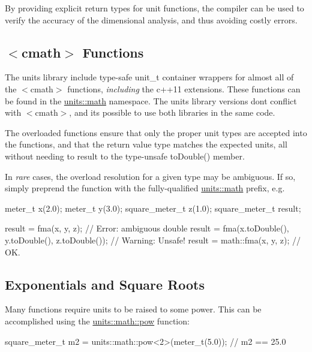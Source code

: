 By providing explicit return types for unit functions, the compiler can be used to verify the accuracy of the dimensional analysis, and thus avoiding costly errors.

\subsection*{{\ttfamily $<$cmath$>$} Functions }

The {\ttfamily units} library include type-\/safe unit\+\_\+t container wrappers for almost all of the $<$cmath$>$ functions, {\itshape including} the c++11 extensions. These functions can be found in the {\ttfamily \hyperlink{namespaceunits_1_1math}{units\+::math}} namespace. The {\ttfamily units} library versions don\textquotesingle{}t conflict with $<$cmath$>$, and it\textquotesingle{}s possible to use both libraries in the same code.

The overloaded functions ensure that only the proper unit types are accepted into the functions, and that the return value type matches the expected units, all without needing to result to the type-\/unsafe {\ttfamily to\+Double()} member.

In {\itshape rare} cases, the overload resolution for a given type may be ambiguous. If so, simply preprend the function with the fully-\/qualified {\ttfamily \hyperlink{namespaceunits_1_1math}{units\+::math}} prefix, e.\+g. \begin{DoxyVerb}meter_t x(2.0);
meter_t y(3.0);
square_meter_t z(1.0);
square_meter_t result;

result = fma(x, y, z);                                              // Error: ambiguous
double result = fma(x.toDouble(), y.toDouble(), z.toDouble());      // Warning: Unsafe!
result = math::fma(x, y, z);                                        // OK.
\end{DoxyVerb}


\subsection*{Exponentials and Square Roots }

Many functions require units to be raised to some power. This can be accomplished using the {\ttfamily \hyperlink{namespaceunits_1_1math_adf689b7864a5c78a00628574cc8dca6b}{units\+::math\+::pow}} function\+: \begin{DoxyVerb}square_meter_t m2 = units::math::pow<2>(meter_t(5.0));  // m2 == 25.0
\end{DoxyVerb}


